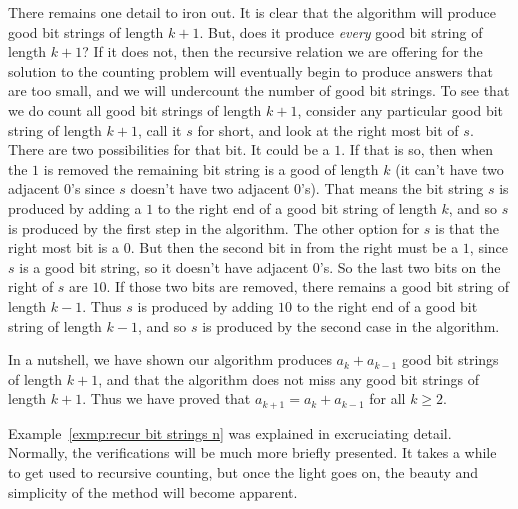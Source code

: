 There remains one detail to iron out. It is clear that the algorithm will
produce good bit strings of length $k+1$. But, does it produce \emph{every}
good bit string of length $k+1$? If it does not, then the recursive relation we
are offering for the solution to the counting problem will eventually begin to
produce answers that are too small, and we will undercount the number of good bit
strings. To see that we do count all good bit strings of length $k+1$, consider
any particular good bit string of length $k+1$, call it $s$ for short,  and look
at the right most 
bit of $s$. There are two possibilities for that bit. It could be a $1$. If that
is so, 
then when the $1$ is removed the remaining bit string is a good of length $k$ (it
can't have two adjacent $0$'s since $s$ doesn't have two adjacent $0$'s). That
means the bit string $s$ is produced by adding a $1$ to the right end of a
good bit string of length $k$, and so $s$ is produced by the first step in the
algorithm. The other option for $s$ is that the right most bit is a $0$. But then
the second bit in from the right must be a $1$, since $s$ is a good bit string, so
it doesn't have adjacent $0$'s. So the last two bits on the right of $s$ are
$10$. If those two bits are removed, there remains a good bit string of length
$k-1$. Thus $s$ is produced by adding $10$ to the right end of a good bit string of
length $k-1$, and so $s$ is produced by the second case in the algorithm.

In a nutshell, we have shown our algorithm produces $a_k+a_{k-1}$ good
bit strings of length $k+1$, and that the algorithm does not miss any good bit
strings of length $k+1$. Thus we have proved that $a_{k+1}=a_k+a_{k-1}$ for all
$k\geq2$. 

Example~\ref{exmp:recur bit strings n} was explained in excruciating detail. Normally, the
verifications will be much more briefly presented. It takes a while to get used to
recursive counting, but once the light goes on, the beauty and simplicity of the method will
become apparent.

